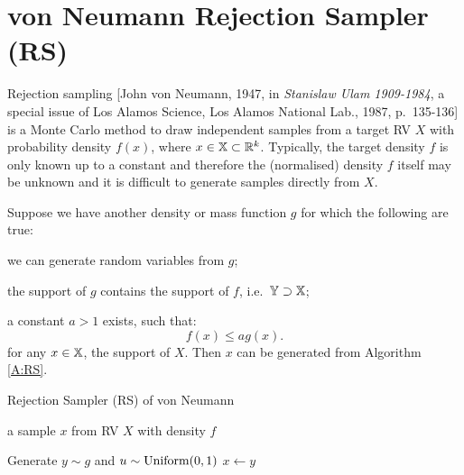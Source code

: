 \section{von Neumann Rejection Sampler (RS)}\label{S:RS}
Rejection sampling [John von Neumann, 1947, in {\it Stanislaw Ulam 1909-1984}, a special issue of Los Alamos Science, Los Alamos National Lab., 1987, p.~135-136] is a Monte Carlo method to draw independent
samples from a target RV $X$ with probability density $f(x)$, where $x \in \mathbb{X} \subset \mathbb{R}^k$.  Typically, the target density $f$ is only known up to a constant and therefore the (normalised) density $f$ itself may be unknown and it  is difficult to generate samples directly from $X$.

Suppose we have another density or mass function $g$ for which the following are true:
\begin{asparaenum}[(a)]
\item	we can generate random variables from $g$;
\item	the support of $g$ contains the support of $f$, i.e.~$\mathbb{Y} \supset \mathbb{X}$;
\item	a constant $a > 1$ exists, such that:
\begin{equation}
f(x)\leq ag(x).
\end{equation}
for any $x\in \mathbb{X}$, the support of $X$.  Then $x$ can be generated from Algorithm \ref*{A:RS}.
\end{asparaenum}

\begin{algorithm}
\caption{Rejection Sampler (RS) of von Neumann}
\label{A:RS}
\begin{algorithmic}[1]
 a sample $x$ from RV $X$ with density $f$

\REPEAT
\STATE Generate $y \sim g$ and $u \sim \mbox{{\rm Uniform}}(0,1)$
 $x \gets y$
\end{algorithmic}
\end{algorithm}

